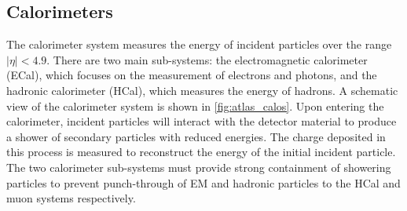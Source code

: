\subsection{Calorimeters}\label{sec:atlas_calorimeter}

The calorimeter system measures the energy of incident particles over the range $|\eta| < 4.9$.
There are two main sub-systems: the electromagnetic calorimeter (ECal), which focuses on the measurement of electrons and photons, and the hadronic calorimeter (HCal), which measures the energy of hadrons.
A schematic view of the calorimeter system is shown in \cref{fig:atlas_calos}.
Upon entering the calorimeter, incident particles will interact with the detector material to produce a shower of secondary particles with reduced energies. 
The charge deposited in this process is measured to reconstruct the energy of the initial incident particle.
The two calorimeter sub-systems must provide strong containment of showering particles to prevent punch-through of EM and hadronic particles to the HCal and muon systems respectively.





